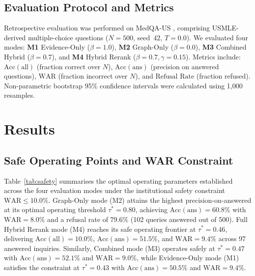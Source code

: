 \documentclass[preprint,12pt,a4paper]{elsarticle}
\begin{document}
\subsection{Evaluation Protocol and Metrics}
\label{sec:eval}

Retrospective evaluation was performed on MedQA-US \citep{jin2021medqa}, comprising
USMLE-derived multiple-choice questions ($N=500$, seed~42, $T=0.0$). We evaluated four
modes: \textbf{M1} Evidence-Only ($\beta=1.0$), \textbf{M2} Graph-Only ($\beta=0.0$),
\textbf{M3} Combined Hybrid ($\beta=0.7$), and \textbf{M4} Hybrid Rerank ($\beta=0.7,
\gamma=0.15$). Metrics include: $\text{Acc}(\text{all})$ (fraction correct over $N$),
$\text{Acc}(\text{ans})$ (precision on answered questions), $\text{WAR}$ (fraction
incorrect over $N$), and $\text{Refusal Rate}$ (fraction refused). Non-parametric
bootstrap 95\% confidence intervals were calculated using 1,000 resamples.

\section{Results}
\label{sec:results}

\subsection{Safe Operating Points and WAR Constraint}
\label{sec:safety}

Table~\ref{tab:safety} summarises the optimal operating parameters established across the
four evaluation modes under the institutional safety constraint $\text{WAR} \leq 10.0\%$.
Graph-Only mode (M2) attains the highest precision-on-answered at its optimal operating
threshold $\tau^*=0.80$, achieving $\text{Acc}(\text{ans}) = 60.8\%$ with $\text{WAR} = 8.0\%$
and a refusal rate of 79.6\% (102 queries answered out of 500). Full Hybrid Rerank mode
(M4) reaches its safe operating frontier at $\tau^*=0.46$, delivering $\text{Acc}(\text{all}) = 10.0\%$,
$\text{Acc}(\text{ans}) = 51.5\%$, and $\text{WAR} = 9.4\%$ across 97 answered inquiries.
Similarly, Combined mode (M3) operates safely at $\tau^*=0.47$ with $\text{Acc}(\text{ans}) = 52.1\%$
and $\text{WAR} = 9.0\%$, while Evidence-Only mode (M1) satisfies the constraint at $\tau^*=0.43$
with $\text{Acc}(\text{ans}) = 50.5\%$ and $\text{WAR} = 9.4\%$.
\end{document}
